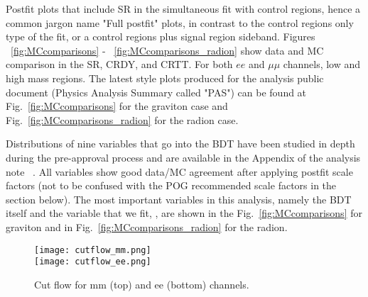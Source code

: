 Postfit plots that include SR in the simultaneous fit with control regions, hence a common jargon name "Full postfit" plots, in contrast to the control regions only type of the fit, or a control regions plus signal region sideband. Figures ~\ref{fig:MCcomparisons} - ~\ref{fig:MCcomparisons_radion} show data and MC comparison in the SR, CRDY, and CRTT. For both $ee$ and $\mu\mu$ channels, low and high mass regions. The latest style plots produced for the analysis public document (Physics Analysis Summary called "PAS") can be found at Fig.~\ref{fig:MCcomparisons} for the graviton case and Fig.~\ref{fig:MCcomparisons_radion} for the radion case. 



Distributions of nine variables that go into the BDT have been studied in depth during the pre-approval process and are available in the Appendix of the analysis note ~\cite{bbZZAN}. All variables show good data/MC agreement after applying postfit scale factors (not to be confused with the POG recommended scale factors in the section below). %
The most important variables in this analysis, namely the BDT itself and the variable that we fit, \mTHH, are shown in the Fig.~\ref{fig:MCcomparisons} for graviton and in Fig.~\ref{fig:MCcomparisons_radion} for the radion. 


\begin{figure}[tbp]
  \begin{center}
    \texttt{[image: cutflow\_mm.png]}\\
    \texttt{[image: cutflow\_ee.png]}\\
    \caption{Cut flow for mm (top) and ee (bottom) channels. }
    \label{fig:cutFlow}
  \end{center}
\end{figure}


                                                                                                                                            

